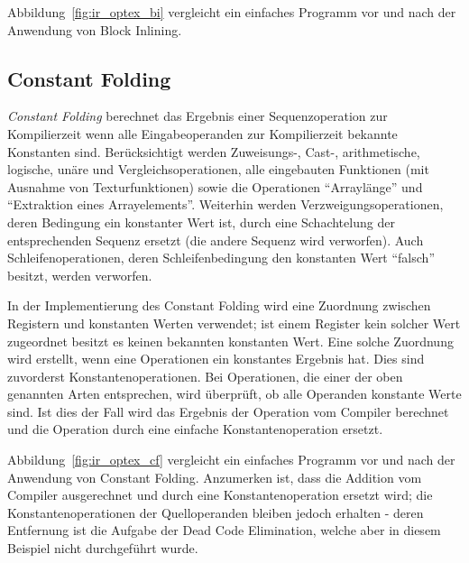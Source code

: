 \documentclass[twoside,a4paper,fleqn,12pt]{book}
\begin{document}
Abbildung~\ref{fig:ir_optex_bi} vergleicht ein einfaches Programm vor und nach der Anwendung von Block Inlining.


\subsection{Constant Folding}

\emph{Constant Folding} berechnet das Ergebnis einer Sequenzoperation zur Kompilierzeit
wenn alle Eingabeoperanden zur Kompilierzeit bekannte Konstanten sind. Berücksichtigt
werden Zuweisungs-, Cast-, arithmetische, logische, unäre und Vergleichsoperationen, alle eingebauten
Funktionen (mit Ausnahme von Texturfunktionen) sowie die Operationen "`Arraylänge"' und
"`Extraktion eines Arrayelements"'.
Weiterhin werden Verzweigungsoperationen, deren Bedingung ein konstanter Wert ist,
durch eine Schachtelung der entsprechenden Sequenz ersetzt (die andere Sequenz wird verworfen).
Auch Schleifenoperationen, deren Schleifenbedingung den konstanten Wert "`falsch"' besitzt,
werden verworfen.

In der Implementierung des Constant Folding wird eine Zuordnung zwischen Registern und konstanten
Werten verwendet; ist einem Register kein solcher Wert zugeordnet besitzt es keinen bekannten
konstanten Wert. Eine solche Zuordnung wird erstellt, wenn eine Operationen ein konstantes
Ergebnis hat. Dies sind zuvorderst Konstantenoperationen.
Bei Operationen, die einer der oben genannten Arten entsprechen, wird überprüft, ob alle Operanden
konstante Werte sind. Ist dies der Fall wird das Ergebnis der Operation vom Compiler berechnet
und die Operation durch eine einfache Konstantenoperation ersetzt.


Abbildung~\ref{fig:ir_optex_cf} vergleicht ein einfaches Programm vor und nach der Anwendung von Constant Folding.
Anzumerken ist, dass die Addition vom Compiler ausgerechnet und durch eine Konstantenoperation ersetzt
wird; die Konstantenoperationen der Quelloperanden bleiben jedoch erhalten - deren Entfernung ist
die Aufgabe der Dead Code Elimination, welche aber in diesem Beispiel nicht durchgeführt wurde.
\end{document}
